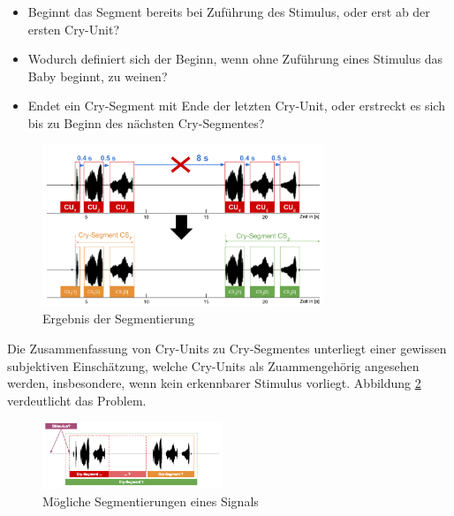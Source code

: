 \begin{itemize}[leftmargin=*]
	\item Beginnt das Segment bereits bei Zuführung des Stimulus, oder erst ab der ersten Cry-Unit? 
	\item Wodurch definiert sich der Beginn, wenn ohne Zuführung eines Stimulus das Baby beginnt, zu weinen?
	\item Endet ein Cry-Segment mit Ende der letzten \glqq Cry-Unit\grqq{}, oder erstreckt es sich bis zu Beginn des nächsten Cry-Segmentes?
\end{itemize}

\begin{figure}[h]
	\centering
	\includegraphics[width=0.75\textwidth]{bilder/segmentierung06.png}
	\caption{Ergebnis der Segmentierung}
	\label{img:segmenting03}
\end{figure}


Die Zusammenfassung von Cry-Units zu Cry-Segmentes unterliegt einer gewissen subjektiven Einschätzung, welche Cry-Units als Zuammengehörig angesehen werden, insbesondere, wenn kein erkennbarer Stimulus vorliegt. Abbildung \ref{img:segmenting02} verdeutlicht das Problem. 

\begin{figure}[H]
	\centering
	\includegraphics[width=0.48\textwidth]{bilder/segmentierung04.png}
	\caption{Mögliche Segmentierungen eines Signals}
	\label{img:segmenting02}
\end{figure}


